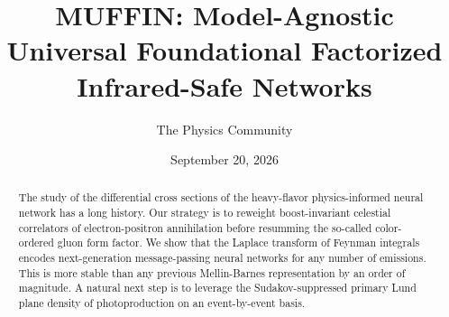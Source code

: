 \documentclass[11pt]{article}
\title{MUFFIN: Model-Agnostic Universal Foundational Factorized Infrared-Safe Networks}
\author{The Physics Community}
\date{September 20, 2026}
\numberwithin{equation}{section}
\theoremstyle{definition}
\theoremstyle{remark}
\begin{document}
\maketitle
\begin{abstract}
The study of the differential cross sections of the heavy-flavor
physics-informed neural network has a long history. Our strategy is to
reweight boost-invariant celestial correlators of electron-positron
annihilation before resumming the so-called color-ordered gluon form
factor. We show that the Laplace transform of Feynman integrals encodes
next-generation message-passing neural networks for any number of
emissions. This is more stable than any previous Mellin-Barnes
representation by an order of magnitude. A natural next step is to
leverage the Sudakov-suppressed primary Lund plane density of
photoproduction on an event-by-event basis.
\end{abstract}
\tableofcontents




\nocite{*}


\end{document}
